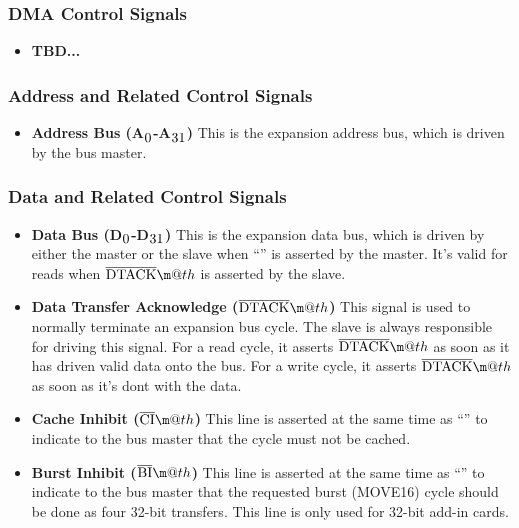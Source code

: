 \documentclass{article}
\makeatletter
\newcommand*{\textoverline}[1]{$\overline{\hbox{#1}}\m@th$}
\newcommand{\textss}[1]{$_{\hbox{#1}}$}
\makeatother
\begin{document}
\subsubsection{DMA Control Signals}

\begin{itemize}
	\item{\textbf{TBD...}}
\end{itemize}

\subsubsection{Address and Related Control Signals}

\begin{itemize}

	\item{\textbf{Address Bus (A\textss{0}-A\textss{31})}} This is the
	expansion address bus, which is driven by the bus master.

\end{itemize}

\subsubsection{Data and Related Control Signals}

\begin{itemize}
	\item{\textbf{Data Bus (D\textss{0}-D\textss{31})}} This is the
	expansion data bus, which is driven by either the master or the slave
	when ``'' is asserted by the master. It's valid for reads when
	\textoverline{DTACK} is asserted by the slave.

	\item{\textbf{Data Transfer Acknowledge (\textoverline{DTACK})}} This
	signal is used to normally terminate an expansion bus cycle. The slave
	is always responsible for driving this signal. For a read cycle, it
	asserts \textoverline{DTACK} as soon as it has driven valid data onto
	the bus. For a write cycle, it asserts \textoverline{DTACK} as soon as
	it's dont with the data.

	\item{\textbf{Cache Inhibit (\textoverline{CI})}} This line is asserted
	at the same time as ``'' to indicate to the bus master that the cycle
	must not be cached.

	\item{\textbf{Burst Inhibit (\textoverline{BI})}} This line is asserted
	at the same time as ``'' to indicate to the bus master that the
	requested burst (MOVE16) cycle should be done as four 32-bit transfers.
	This line is only used for 32-bit add-in cards.
\end{itemize}
\end{document}
